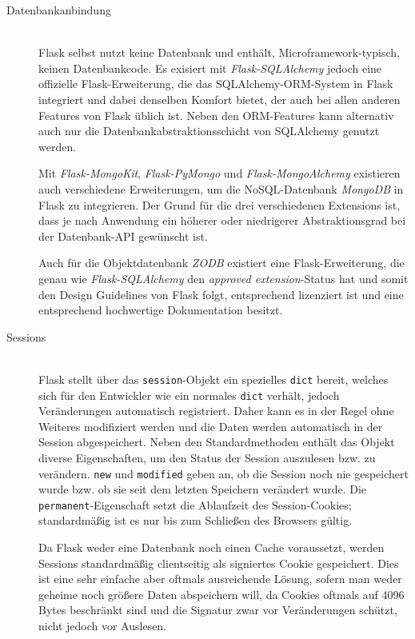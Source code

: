 \begin{description}
\newpage
\item[Datenbankanbindung] \hfill \\
Flask selbst nutzt keine Datenbank und enthält, Microframework-typisch, keinen Datenbankcode. Es
exisiert mit \emph{Flask-SQLAlchemy} jedoch eine offizielle Flask-Erweiterung, die das
SQLAlchemy-ORM-System in Flask integriert und dabei denselben Komfort bietet, der auch bei allen
anderen Features von Flask üblich ist. Neben den ORM-Features kann alternativ auch nur die
Datenbankabstraktionsschicht von SQLAlchemy genutzt werden.

Mit \emph{Flask-MongoKit}, \emph{Flask-PyMongo} und \emph{Flask-MongoAlchemy} existieren auch
verschiedene Erweiterungen, um die NoSQL-Datenbank \emph{MongoDB} in Flask zu integrieren. Der Grund
für die drei verschiedenen Extensions ist, dass je nach Anwendung ein höherer oder niedrigerer
Abstraktionsgrad bei der Datenbank-API gewünscht ist.

Auch für die Objektdatenbank \emph{ZODB} existiert eine Flask-Erweiterung, die genau wie
\emph{Flask-SQLAlchemy} den \emph{approved extension}-Status hat und somit den Design Guidelines von
Flask folgt, entsprechend lizenziert ist und eine entsprechend hochwertige Dokumentation besitzt.


\item[Sessions] \hfill \\
Flask stellt über das \lstinline{session}-Objekt ein spezielles \lstinline{dict} bereit, welches
sich für den Entwickler wie ein normales \lstinline{dict} verhält, jedoch Veränderungen automatisch
registriert. Daher kann es in der Regel ohne Weiteres modifiziert werden und die Daten werden
automatisch in der Session abgespeichert. Neben den Standardmethoden enthält das Objekt diverse
Eigenschaften, um den Status der Session auszulesen bzw. zu verändern. \lstinline{new} und
\lstinline{modified} geben an, ob die Session noch nie gespeichert wurde bzw. ob sie seit dem
letzten Speichern verändert wurde. Die \lstinline{permanent}-Eigenschaft setzt die Ablaufzeit des
Session-Cookies; standardmäßig ist es nur bis zum Schließen des Browsers gültig.

Da Flask weder eine Datenbank noch einen Cache voraussetzt, werden Sessions standardmäßig
clientseitig als signiertes Cookie gespeichert. Dies ist eine sehr einfache aber oftmals
ausreichende Lösung, sofern man weder geheime noch größere Daten abspeichern will, da Cookies
oftmals auf 4096 Bytes beschränkt sind und die Signatur zwar vor Veränderungen schützt, nicht jedoch
vor Auslesen.


\end{description}
